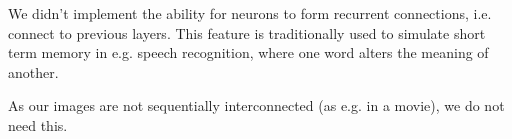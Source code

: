 We didn't implement the ability for neurons to form recurrent connections, i.e. connect to previous layers. This feature is traditionally used to simulate short term memory in e.g. speech recognition, where one word alters the meaning of another. \cite{HasimSak2014}  

As our images are not sequentially interconnected (as e.g. in a movie), we do not need this.